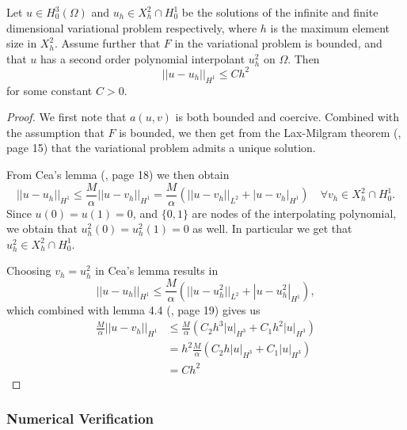 \begin{theorem}
    Let $u \in H_0^3(\Omega)$ and $u_h \in X_h^2 \cap H_0^1$ be the solutions of the infinite and finite dimensional
    variational problem respectively, where $h$ is the maximum element size in $X_h^2$. Assume further that $F$ in the variational problem is bounded,
    and that $u$ has a second order polynomial interpolant $u_h^2$ on $\Omega$. Then
    \begin{equation}
        ||u - u_h||_{H^1} \leq Ch^2
    \end{equation}
    for some constant $C > 0$.
\end{theorem}
\begin{proof}
  We first note that $a(u, v)$ is both bounded and coercive. Combined with the assumption that $F$ is bounded, we then get from the Lax-Milgram theorem (\cite{CC}, page 15)
    that the variational problem admits a unique solution.
    
    From Cea's lemma (\cite{CC}, page 18) we then obtain
    \begin{equation}
        ||u - u_h||_{H^1} \leq \frac{M}{\alpha}||u - v_h||_{H^1} = \frac{M}{\alpha}(||u - v_h||_{L^2} + |u - v_h|_{H^1}) \quad \forall v_h \in X_h^2 \cap H_0^1.
    \end{equation}
    Since $u(0) = u(1) = 0$, and $\{0, 1\}$ are nodes of the interpolating polynomial, we obtain that $u_h^2(0) = u_h^2(1) = 0$ as well.
    In particular we get that $u_h^2 \in X_h^2 \cap H_0^1$.
    
    Choosing $v_h = u_h^2$ in Cea's lemma results in 
    \begin{equation}
        ||u - u_h||_{H^1} \leq \frac{M}{\alpha}(||u - u_h^2||_{L^2} + |u - u_h^2|_{H^1}),
    \end{equation}
    which combined with lemma 4.4 (\cite{CC}, page 19) gives us
    \begin{equation}
        \begin{aligned}
            \frac{M}{\alpha}||u - v_h||_{H^1} &\leq \frac{M}{\alpha}(C_{2}h^3|u|_{H^3} + C_{1}h^2|u|_{H^3}) \\
            &= h^2\frac{M}{\alpha}(C_{2}h|u|_{H^3} + C_{1}|u|_{H^3}) \\
            &= Ch^2
        \end{aligned}
    \end{equation}
\end{proof}

\subsubsection{Numerical Verification}


